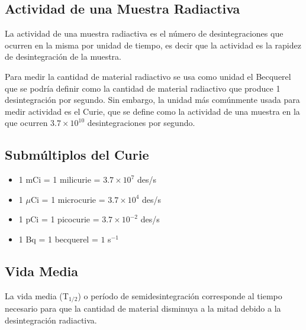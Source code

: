 \subsection*{Actividad de una Muestra Radiactiva}

La actividad de una muestra radiactiva es el número de desintegraciones que ocurren en la misma por unidad de tiempo, es decir que la actividad es la rapidez de desintegración de la muestra.

Para medir la cantidad de material radiactivo se usa como unidad el Becquerel que se podría definir como la cantidad de material radiactivo que produce 1 desintegración por segundo. Sin embargo, la unidad más comúnmente usada para medir actividad es el Curie, que se define como la actividad de una muestra en la que ocurren $3.7 \times 10^{10}$ desintegraciones por segundo.

\subsection*{Submúltiplos del Curie}

\begin{itemize}
    \item 1 mCi = 1 milicurie = $3.7 \times 10^7$ des/s
    \item 1 $\mu$Ci = 1 microcurie = $3.7 \times 10^4$ des/s
    \item 1 pCi = 1 picocurie = $3.7 \times 10^{-2}$ des/s
    \item 1 Bq = 1 becquerel = $1$ s$^{-1}$
\end{itemize}

\subsection*{Vida Media}
La vida media (T$_{1/2}$) o período de semidesintegración corresponde al tiempo necesario para que la cantidad de material disminuya a la mitad debido a la desintegración radiactiva.
